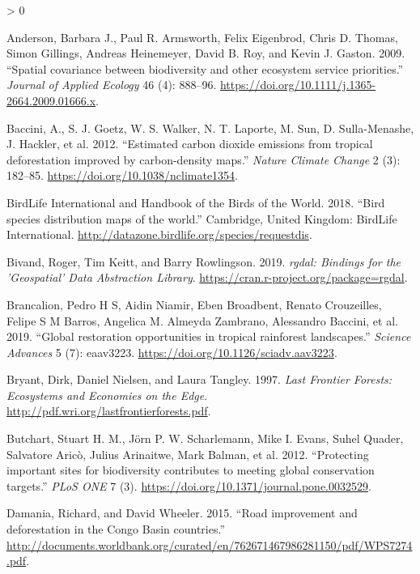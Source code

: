\documentclass[
]{article}
\newlength{\cslhangindent}
\newenvironment{CSLReferences}[2] %
 {%
  \setlength{\parindent}{0pt}
  \ifodd #1 \everypar{\setlength{\hangindent}{\cslhangindent}}\ignorespaces\fi
  \ifnum #2 > 0
  \setlength{\parskip}{#2\baselineskip}
  \fi
 }%
 {}
\begin{document}
\hypertarget{refs}{}
\begin{CSLReferences}{1}{0}
\leavevmode\hypertarget{ref-Anderson2009}{}%
Anderson, Barbara J., Paul R. Armsworth, Felix Eigenbrod, Chris D. Thomas, Simon Gillings, Andreas Heinemeyer, David B. Roy, and Kevin J. Gaston. 2009. {``{Spatial covariance between biodiversity and other ecosystem service priorities}.''} \emph{Journal of Applied Ecology} 46 (4): 888--96. \url{https://doi.org/10.1111/j.1365-2664.2009.01666.x}.

\leavevmode\hypertarget{ref-Baccini2012}{}%
Baccini, A., S. J. Goetz, W. S. Walker, N. T. Laporte, M. Sun, D. Sulla-Menashe, J. Hackler, et al. 2012. {``{Estimated carbon dioxide emissions from tropical deforestation improved by carbon-density maps}.''} \emph{Nature Climate Change} 2 (3): 182--85. \url{https://doi.org/10.1038/nclimate1354}.

\leavevmode\hypertarget{ref-BirdLife2018}{}%
BirdLife International and Handbook of the Birds of the World. 2018. {``{Bird species distribution maps of the world}.''} Cambridge, United Kingdom: BirdLife International. \url{http://datazone.birdlife.org/species/requestdis}.

\leavevmode\hypertarget{ref-R-rgdal}{}%
Bivand, Roger, Tim Keitt, and Barry Rowlingson. 2019. \emph{{rgdal: Bindings for the 'Geospatial' Data Abstraction Library}}. \url{https://cran.r-project.org/package=rgdal}.

\leavevmode\hypertarget{ref-Brancalion2019}{}%
Brancalion, Pedro H S, Aidin Niamir, Eben Broadbent, Renato Crouzeilles, Felipe S M Barros, Angelica M. Almeyda Zambrano, Alessandro Baccini, et al. 2019. {``{Global restoration opportunities in tropical rainforest landscapes}.''} \emph{Science Advances} 5 (7): eaav3223. \url{https://doi.org/10.1126/sciadv.aav3223}.

\leavevmode\hypertarget{ref-Bryant1997}{}%
Bryant, Dirk, Daniel Nielsen, and Laura Tangley. 1997. \emph{{Last Frontier Forests: Ecosystems and Economies on the Edge}}. \url{http://pdf.wri.org/lastfrontierforests.pdf}.

\leavevmode\hypertarget{ref-Butchart2012}{}%
Butchart, Stuart H. M., Jörn P. W. Scharlemann, Mike I. Evans, Suhel Quader, Salvatore Aricò, Julius Arinaitwe, Mark Balman, et al. 2012. {``{Protecting important sites for biodiversity contributes to meeting global conservation targets}.''} \emph{PLoS ONE} 7 (3). \url{https://doi.org/10.1371/journal.pone.0032529}.

\leavevmode\hypertarget{ref-Damania2015}{}%
Damania, Richard, and David Wheeler. 2015. {``{Road improvement and deforestation in the Congo Basin countries.}''} \url{http://documents.worldbank.org/curated/en/762671467986281150/pdf/WPS7274.pdf}.


\end{CSLReferences}
\end{document}
